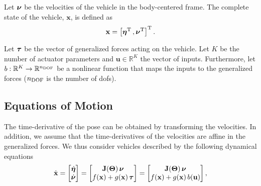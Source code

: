 Let $\bm{\nu}$ be the velocities of the vehicle in the body-centered frame.
%
The complete state of the vehicle, $\mathbf{x}$, is defined as
\begin{equation}
    \mathbf{x} = \left[ \bm{\eta}^{\rm T} \,, \bm{\nu}^{\rm T} \right]^{\rm T}.
\end{equation}

Let $\bm{\tau}$ be the vector of generalized forces acting on the vehicle.
Let $K$ be the number of actuator parameters and $\mathbf{u} \in \mathbb{R}^{K}$ the vector of inputs.
Furthermore, let $b : \mathbb{R}^{K} \rightarrow \mathbb{R}^{n_{\rm DOF}}$ be a nonlinear function that maps the inputs to the generalized forces ($n_{\rm DOF}$ is the number of \glspl{dof}).

\subsection{Equations of Motion}

The time-derivative of the pose can be obtained by transforming the velocities. %
In addition, we assume that the time-derivatives of the velocities are affine in the generalized forces.
We thus consider vehicles described by the following dynamical equations
\begin{equation}
    \dot{\mathbf{x}} = \begin{bmatrix} \dot{\bm{\eta}} \\ \dot{\bm{\nu}} \end{bmatrix} = \begin{bmatrix}
        \mathbf{J}(\bm{\Theta})\,\bm{\nu} \\ f(\mathbf{x}) + g(\mathbf{x})\,\bm{\tau}
    \end{bmatrix} = \begin{bmatrix}
        \mathbf{J}(\bm{\Theta})\,\bm{\nu} \\ f(\mathbf{x}) + g(\mathbf{x})\,b(\mathbf{u})
    \end{bmatrix},
    \label{eq:ccta_affine_model}
\end{equation}

